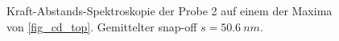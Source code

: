 \documentclass[
	a4paper,
	12pt,
	pagesize,
	ngerman
]{scrartcl}
\begin{document}
\begin{figure}[H]
			\caption{Kraft-Abstands-Spektroskopie der Probe 2 auf einem der Maxima von \cref{fig_cd_top}. Gemittelter snap-off $s=\SI{50.6}{nm}$.} %
			\label{fig_cd_ds}
\end{figure}
\end{document}
